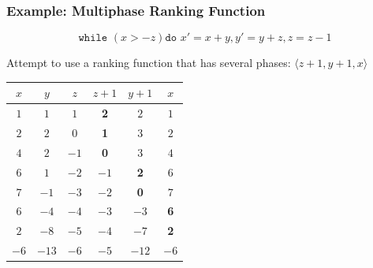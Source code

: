\documentclass[11pt]{beamer}
\begin{document}
\begin{frame}\frametitle{Example: Multiphase Ranking Function}
\[\texttt{while }( x > -z) \texttt{do } x' = x + y, y' = y + z, z = z - 1\]

Attempt to use a ranking function that has several phases: 
$\langle z + 1, y + 1, x\rangle$
\begin{center}
\begin{tabular}{|c|c|c|c|c|c|}
\hline 
$x$&$y$&$z$&$z+1$&$y+1$&$x$\\
\hline
$1$&$1$&$1$&\textbf{2}&$2$&$1$\\
$2$&$2$&$0$&\textbf{1}&$3$&$2$\\
$4$&$2$&$-1$&\textbf{0}&$3$&$4$\\
\hline
$6$&$1$&$-2$&$-1$&\textbf{2}&$6$\\
$7$&$-1$&$-3$&$-2$&\textbf{0}&$7$\\
\hline
$6$&$-4$&$-4$&$-3$&$-3$&\textbf{6}\\
$2$&$-8$&$-5$&$-4$&$-7$&\textbf{2}\\
\hline
$-6$&$-13$&$-6$&$-5$&$-12$&$-6$\\
\hline
\end{tabular}
\end{center}
\end{frame}
\end{document}
